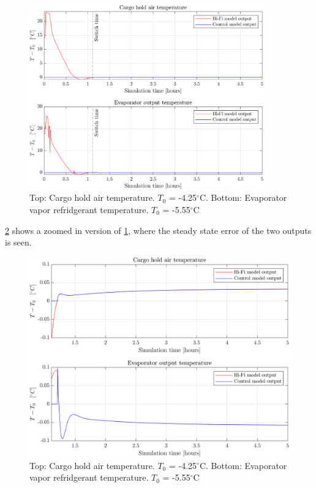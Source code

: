 \begin{figure}[h!]
	\centering
	\includegraphics[width=0.9\textwidth]{Graphics/fig_LQR_wellTuned_noDist.png}
	\caption{Top: Cargo hold air temperature. $T_0$ = -4.25$^{\circ}$C. Bottom: Evaporator vapor refridgerant temperature. $T_0$ = -5.55$^{\circ}$C}
	\label{fig:LQR_wellTuned_noDist}
\end{figure}

\cref{fig:LQR_wellTuned_noDist_zoom} shows a zoomed in version of \cref{fig:LQR_wellTuned_noDist}, where the steady state error of the two outputs is seen.\\


\begin{figure}[h!]
	\centering
	\includegraphics[width=1\textwidth]{Graphics/fig_LQR_wellTuned_noDist_zoom.png}
	\caption{Top: Cargo hold air temperature. $T_0$ = -4.25$^{\circ}$C. Bottom: Evaporator vapor refridgerant temperature. $T_0$ = -5.55$^{\circ}$C}
	\label{fig:LQR_wellTuned_noDist_zoom}
\end{figure}

